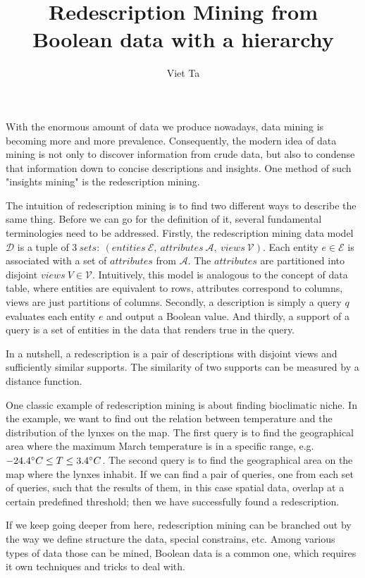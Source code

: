 \documentclass[12pt,a4paper,draft]{article}
\author{Viet Ta}
\title{Redescription Mining from Boolean data with a hierarchy}
\begin{document}
\maketitle

With the enormous amount of data we produce nowadays, data mining is becoming more and more prevalence. Consequently, the modern idea of data mining is not only to discover information from crude data, but also to condense that information down to concise descriptions and insights. One method of such "insights mining" is the redescription mining.

The intuition of redescription mining is to find two different ways to describe the same thing. Before we can go for the definition of it, several fundamental terminologies need to be addressed.
Firstly, the redescription mining data model $\mathcal{D}$ is a tuple of $3\ sets:\ \left( entities \ \mathcal{E},\ attributes\ \mathcal{A},\ views\ \mathcal{V}\right)$. Each entity $e \in \mathcal{E}$ is associated with a set of $attributes$ from $\mathcal{A}$. The $attributes$ are partitioned into disjoint $views\ V \in \mathcal{V}$. Intuitively, this model is analogous to the concept of data table, where entities are equivalent to rows, attributes correspond to columns, views are just partitions of columns. Secondly, a description is simply a query $q$ evaluates each entity $e$ and output a Boolean value. And thirdly, a support of a query is a set of entities in the data that renders true in the query.

In a nutshell, a redescription is a pair of descriptions with disjoint views and sufficiently similar supports. %
The similarity of two supports can be measured by a distance function.

One classic example of redescription mining is about finding bioclimatic niche. In the example, we want to find out the relation between temperature and the distribution of the lynxes on the map. The first query is to find the geographical area where the maximum March temperature is in a specific range, e.g. \(-24.4 \degree C \leq T \leq 3.4\degree C\). The second query is to find the geographical area on the map where the lynxes inhabit. If we can find a pair of queries, one from each set of queries, such that the results of them, in this case spatial data, overlap at a certain predefined threshold; then we have successfully found a redescription.

If we keep going deeper from here, redescription mining can be branched out by the way we define structure the data, special constrains, etc. Among various types of data those can be mined, Boolean data is a common one, which requires it own techniques and tricks to deal with.

\end{document}
